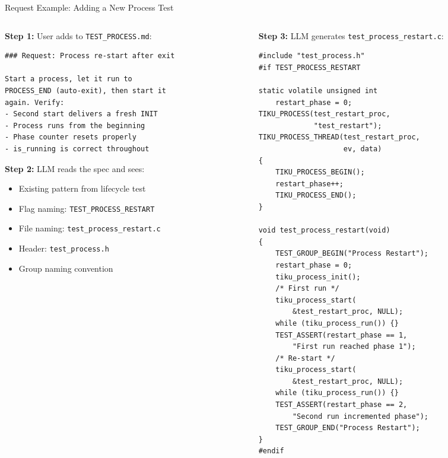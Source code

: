 \documentclass[aspectratio=169, 10pt]{beamer}
\begin{document}
\begin{frame}[fragile]{Request Example: Adding a New Process Test}
\begin{columns}[T]
\begin{column}{0.48\textwidth}
\textbf{Step 1:} User adds to \texttt{TEST\_PROCESS.md}:

\begin{lstlisting}[basicstyle=\ttfamily\tiny, frame=single, backgroundcolor=\color{blue!3},
  title={Requests section in TEST\_PROCESS.md}]
### Request: Process re-start after exit

Start a process, let it run to
PROCESS_END (auto-exit), then start it
again. Verify:
- Second start delivers a fresh INIT
- Process runs from the beginning
- Phase counter resets properly
- is_running is correct throughout
\end{lstlisting}

\vspace{0.3em}
\textbf{Step 2:} LLM reads the spec and sees:
\begin{itemize}
  \item Existing pattern from lifecycle test
  \item Flag naming: \texttt{TEST\_PROCESS\_RESTART}
  \item File naming: \texttt{test\_process\_restart.c}
  \item Header: \texttt{test\_process.h}
  \item Group naming convention
\end{itemize}
\end{column}

\begin{column}{0.48\textwidth}
\textbf{Step 3:} LLM generates \texttt{test\_process\_restart.c}:

\begin{lstlisting}[style=cstyle, basicstyle=\ttfamily\tiny,
  title={Generated: follows existing conventions}]
#include "test_process.h"
#if TEST_PROCESS_RESTART

static volatile unsigned int
    restart_phase = 0;
TIKU_PROCESS(test_restart_proc,
             "test_restart");
TIKU_PROCESS_THREAD(test_restart_proc,
                    ev, data)
{
    TIKU_PROCESS_BEGIN();
    restart_phase++;
    TIKU_PROCESS_END();
}

void test_process_restart(void)
{
    TEST_GROUP_BEGIN("Process Restart");
    restart_phase = 0;
    tiku_process_init();
    /* First run */
    tiku_process_start(
        &test_restart_proc, NULL);
    while (tiku_process_run()) {}
    TEST_ASSERT(restart_phase == 1,
        "First run reached phase 1");
    /* Re-start */
    tiku_process_start(
        &test_restart_proc, NULL);
    while (tiku_process_run()) {}
    TEST_ASSERT(restart_phase == 2,
        "Second run incremented phase");
    TEST_GROUP_END("Process Restart");
}
#endif
\end{lstlisting}
\end{column}
\end{columns}
\end{frame}
\end{document}
